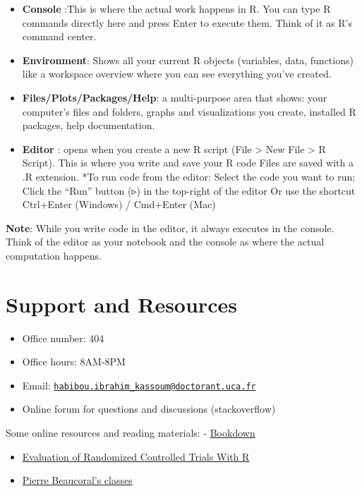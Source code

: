 \documentclass[
]{book}
\providecommand{\tightlist}{%
  \setlength{\itemsep}{0pt}\setlength{\parskip}{0pt}}
\begin{document}
\begin{itemize}
\item
  \textbf{Console} :This is where the actual work happens in R. You can type R commands directly here and press Enter to execute them. Think of it as R's command center.
\item
  \textbf{Environment}: Shows all your current R objects (variables, data, functions) like a workspace overview where you can see everything you've created.
\item
  \textbf{Files/Plots/Packages/Help}: a multi-purpose area that shows: your computer's files and folders, graphs and visualizations you create, installed R packages, help documentation.
\item
  \textbf{Editor} : opens when you create a new R script (File \textgreater{} New File \textgreater{} R Script). This is where you write and save your R code Files are saved with a .R extension.
  *To run code from the editor: Select the code you want to run; Click the ``Run'' button (▹) in the top-right of the editor Or use the shortcut Ctrl+Enter (Windows) / Cmd+Enter (Mac)
\end{itemize}

\textbf{Note}: While you write code in the editor, it always executes in the console. Think of the editor as your notebook and the console as where the actual computation happens.

\section{Support and Resources}\label{support-and-resources}

\begin{itemize}
\tightlist
\item
  Office number: 404
\item
  Office hours: 8AM-8PM
\item
  Email: \href{mailto:habibou.ibrahim_kassoum@doctorant.uca.fr}{\nolinkurl{habibou.ibrahim\_kassoum@doctorant.uca.fr}}
\item
  Online forum for questions and discussions (stackoverflow)
\end{itemize}

Some online resources and reading materials:
- \href{https://bookdown.org/}{Bookdown}

\begin{itemize}
\item
  \href{https://rct-tutorial.mharrer.dev/preparation}{Evaluation of Randomized Controlled Trials With R}
\item
  \href{https://pierrebeaucoral.github.io/course/r-for-beginners/CoursR.html\#course-outline}{Pierre Beaucoral's classes}
\end{itemize}
\end{document}
